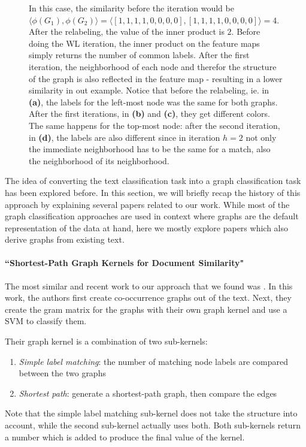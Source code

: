 \begin{figure}[htb!]
{  In this case, the similarity before the iteration would be $\langle \phi(G_1), \phi(G_2) \rangle = \langle [1, 1, 1, 1, 0, 0, 0, 0], [1, 1, 1, 1, 0, 0, 0, 0] \rangle = 4$. After the relabeling, the value of the inner product is $2$.
  Before doing the WL iteration, the inner product on the feature maps simply returns the number of common labels. After the first iteration, the neighborhood of each node and therefor the structure of the graph is also reflected in the feature map - resulting in a lower similarity in out example.
  Notice that before the relabeling, ie. in \textbf{(a)}, the labels for the left-most node was the same for both graphs. After the first iterations, in \textbf{(b)} and \textbf{(c)}, they get different colors.
  The same happens for the top-most node: after the second iteration, in \textbf{(d)}, the labels are also different since in iteration $h=2$ not only the immediate neighborhood has to be the same for a match, also the neighborhood of its neighborhood.}
	\label{fig:wl_example}
\end{figure}


The idea of converting the text classification task into a graph classification task has been explored before.
In this section, we will briefly recap the history of this approach by explaining several papers related to our work.
While most of the graph classification approaches are used in context where graphs are the default representation of the data at hand, here we mostly explore papers which also derive graphs from existing text.


\paragraph{``Shortest-Path Graph Kernels for Document Similarity" \cite{Nikolentzos2017a}}
The most similar and recent work to our approach that we found was \cite{Nikolentzos2017a}. In this work, the authors first create co-occurrence graphs out of the text. Next, they create the gram matrix for the graphs with their own graph kernel and use a SVM to classify them.

Their graph kernel is a combination of two sub-kernels:
\begin{enumerate}
    \item{\textit{Simple label matching}: the number of matching node labels are compared between the two graphs}
    \item{\textit{Shortest path}: generate a shortest-path graph, then compare the edges}
\end{enumerate}
Note that the simple label matching sub-kernel does not take the structure into account, while the second sub-kernel actually uses both.
Both sub-kernels return a number which is added to produce the final value of the kernel.

